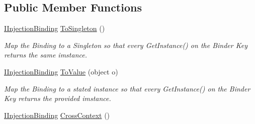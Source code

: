 \subsection*{Public Member Functions}
\begin{DoxyCompactItemize}
\item 
\hypertarget{interfacestrange_1_1extensions_1_1injector_1_1api_1_1_i_injection_binding_ae88e872043b9c0c8e6932d6457f8c5e7}{\hyperlink{interfacestrange_1_1extensions_1_1injector_1_1api_1_1_i_injection_binding}{I\-Injection\-Binding} \hyperlink{interfacestrange_1_1extensions_1_1injector_1_1api_1_1_i_injection_binding_ae88e872043b9c0c8e6932d6457f8c5e7}{To\-Singleton} ()}\label{interfacestrange_1_1extensions_1_1injector_1_1api_1_1_i_injection_binding_ae88e872043b9c0c8e6932d6457f8c5e7}

\begin{DoxyCompactList}\small\item\em Map the Binding to a Singleton so that every {\ttfamily Get\-Instance()} on the Binder Key returns the same imstance. \end{DoxyCompactList}\item 
\hypertarget{interfacestrange_1_1extensions_1_1injector_1_1api_1_1_i_injection_binding_a7e7eee027ed73a36c38f18b865bbe4c6}{\hyperlink{interfacestrange_1_1extensions_1_1injector_1_1api_1_1_i_injection_binding}{I\-Injection\-Binding} \hyperlink{interfacestrange_1_1extensions_1_1injector_1_1api_1_1_i_injection_binding_a7e7eee027ed73a36c38f18b865bbe4c6}{To\-Value} (object o)}\label{interfacestrange_1_1extensions_1_1injector_1_1api_1_1_i_injection_binding_a7e7eee027ed73a36c38f18b865bbe4c6}

\begin{DoxyCompactList}\small\item\em Map the Binding to a stated instance so that every {\ttfamily Get\-Instance()} on the Binder Key returns the provided imstance. \end{DoxyCompactList}\item 
\hypertarget{interfacestrange_1_1extensions_1_1injector_1_1api_1_1_i_injection_binding_a9ef8ddab4816a595f4e6db7e66be7d03}{\hyperlink{interfacestrange_1_1extensions_1_1injector_1_1api_1_1_i_injection_binding}{I\-Injection\-Binding} \hyperlink{interfacestrange_1_1extensions_1_1injector_1_1api_1_1_i_injection_binding_a9ef8ddab4816a595f4e6db7e66be7d03}{Cross\-Context} ()}\label{interfacestrange_1_1extensions_1_1injector_1_1api_1_1_i_injection_binding_a9ef8ddab4816a595f4e6db7e66be7d03}


\end{DoxyCompactItemize}
